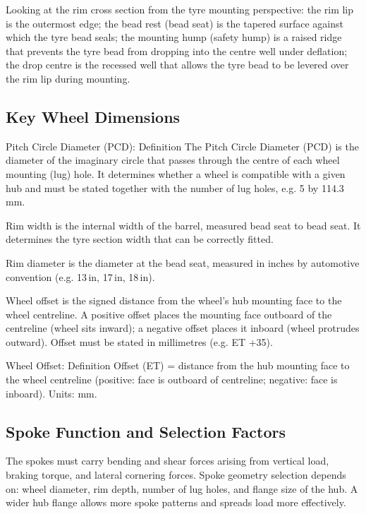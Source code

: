 \documentclass[10pt,a4paper]{article}
\begin{document}
Looking at the rim cross section from the tyre mounting perspective: the rim lip is the outermost edge; the bead rest (bead seat) is the tapered surface against which the tyre bead seals; the mounting hump (safety hump) is a raised ridge that prevents the tyre bead from dropping into the centre well under deflation; the drop centre is the recessed well that allows the tyre bead to be levered over the rim lip during mounting.

\subsection{Key Wheel Dimensions}

\begin{defbox}{Pitch Circle Diameter (PCD): Definition}
The Pitch Circle Diameter (PCD) is the diameter of the imaginary circle that passes through the centre of each wheel mounting (lug) hole. It determines whether a wheel is compatible with a given hub and must be stated together with the number of lug holes, e.g. 5 by 114.3\,mm.
\end{defbox}

Rim width is the internal width of the barrel, measured bead seat to bead seat. It determines the tyre section width that can be correctly fitted.

Rim diameter is the diameter at the bead seat, measured in inches by automotive convention (e.g. 13\,in, 17\,in, 18\,in).

Wheel offset is the signed distance from the wheel's hub mounting face to the wheel centreline. A positive offset places the mounting face outboard of the centreline (wheel sits inward); a negative offset places it inboard (wheel protrudes outward). Offset must be stated in millimetres (e.g. ET +35).

\begin{defbox}{Wheel Offset: Definition}
Offset (ET) = distance from the hub mounting face to the wheel centreline (positive: face is outboard of centreline; negative: face is inboard). Units: mm.
\end{defbox}

\subsection{Spoke Function and Selection Factors}

The spokes must carry bending and shear forces arising from vertical load, braking torque, and lateral cornering forces. Spoke geometry selection depends on: wheel diameter, rim depth, number of lug holes, and flange size of the hub. A wider hub flange allows more spoke patterns and spreads load more effectively.
\end{document}

